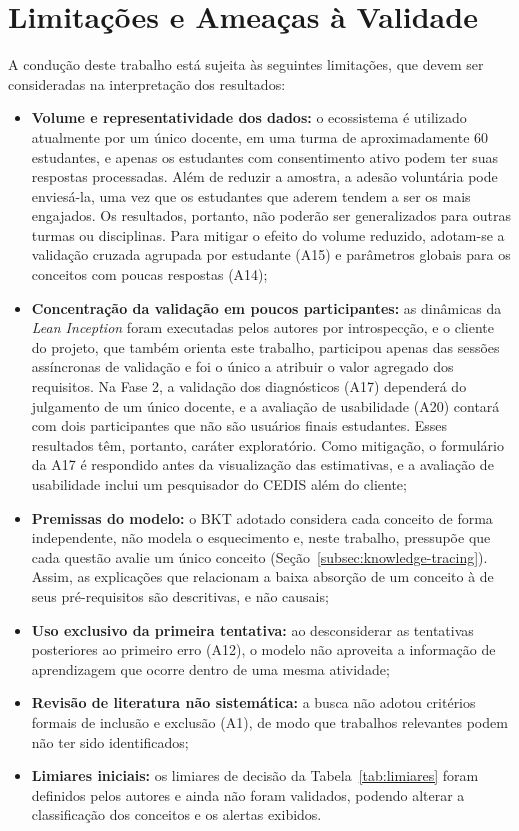 \section{Limitações e Ameaças à Validade}
\label{sec:limitacoes}

A condução deste trabalho está sujeita às seguintes limitações, que devem ser consideradas na interpretação dos resultados:

\begin{itemize}
    \item \textbf{Volume e representatividade dos dados:} o ecossistema é utilizado atualmente por um único docente, em uma turma de aproximadamente 60 estudantes, e apenas os estudantes com consentimento ativo podem ter suas respostas processadas. Além de reduzir a amostra, a adesão voluntária pode enviesá-la, uma vez que os estudantes que aderem tendem a ser os mais engajados. Os resultados, portanto, não poderão ser generalizados para outras turmas ou disciplinas. Para mitigar o efeito do volume reduzido, adotam-se a validação cruzada agrupada por estudante (A15) e parâmetros globais para os conceitos com poucas respostas (A14);
    \item \textbf{Concentração da validação em poucos participantes:} as dinâmicas da \textit{Lean Inception} foram executadas pelos autores por introspecção, e o cliente do projeto, que também orienta este trabalho, participou apenas das sessões assíncronas de validação e foi o único a atribuir o valor agregado dos requisitos. Na Fase 2, a validação dos diagnósticos (A17) dependerá do julgamento de um único docente, e a avaliação de usabilidade (A20) contará com dois participantes que não são usuários finais estudantes. Esses resultados têm, portanto, caráter exploratório. Como mitigação, o formulário da A17 é respondido antes da visualização das estimativas, e a avaliação de usabilidade inclui um pesquisador do CEDIS além do cliente;
    \item \textbf{Premissas do modelo:} o BKT adotado considera cada conceito de forma independente, não modela o esquecimento e, neste trabalho, pressupõe que cada questão avalie um único conceito (Seção~\ref{subsec:knowledge-tracing}). Assim, as explicações que relacionam a baixa absorção de um conceito à de seus pré-requisitos são descritivas, e não causais;
    \item \textbf{Uso exclusivo da primeira tentativa:} ao desconsiderar as tentativas posteriores ao primeiro erro (A12), o modelo não aproveita a informação de aprendizagem que ocorre dentro de uma mesma atividade;
    \item \textbf{Revisão de literatura não sistemática:} a busca não adotou critérios formais de inclusão e exclusão (A1), de modo que trabalhos relevantes podem não ter sido identificados;
    \item \textbf{Limiares iniciais:} os limiares de decisão da Tabela~\ref{tab:limiares} foram definidos pelos autores e ainda não foram validados, podendo alterar a classificação dos conceitos e os alertas exibidos.
\end{itemize}
